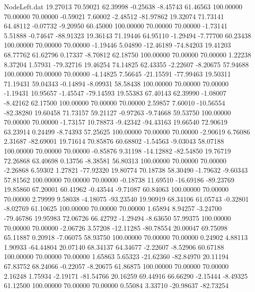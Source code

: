 \begin{filecontents}{NodeLeft.dat}
  19.27013   70.59021   62.39998    -0.25638   -8.45743   61.46563  100.00000   70.00000   70.00000   -0.59021    7.60002   -2.48512  -81.97862
  19.32074   71.73141   64.48112    -0.07732   -9.20950   60.45000  100.00000   70.00000   70.00000   -1.73141    5.51888   -0.74647  -88.91323
  19.36143   71.19446   64.95110    -1.29494   -7.77700   60.23438  100.00000   70.00000   70.00000   -1.19446    5.04890  -12.46189  -74.84203
  19.41203   68.77762   61.62796     0.17337   -8.70812   62.18750  100.00000   70.00000   70.00000    1.22238    8.37204    1.57931  -79.32716
  19.46254   74.14825   62.43355    -2.22607   -8.20675   57.94688  100.00000   70.00000   70.00000   -4.14825    7.56645  -21.15591  -77.99463
  19.50311   71.19431   59.04343    -0.14894   -8.09931   58.58438  100.00000   70.00000   70.00000   -1.19431   10.95657   -1.45547  -79.14593
  19.55383   67.40143   62.39990    -1.08007   -8.42162   62.17500  100.00000   70.00000   70.00000    2.59857    7.60010  -10.56554  -82.38280
  19.60458   71.73157   59.21127    -0.97263   -9.74668   59.53750  100.00000   70.00000   70.00000   -1.73157   10.78873   -9.42342  -94.43163
  19.66540   72.90619   63.23914     0.24499   -8.74393   57.25625  100.00000   70.00000   70.00000   -2.90619    6.76086    2.31687  -82.69001
  19.71614   70.85876   60.68802    -1.54563   -9.03043   58.07188  100.00000   70.00000   70.00000   -0.85876    9.31198  -14.12882  -82.54850
  19.76719   72.26868   63.40698     0.13756   -8.38581   56.80313  100.00000   70.00000   70.00000   -2.26868    6.59302    1.27821  -77.92320
  19.80774   70.18738   58.30490    -1.79632   -9.60343   57.81562  100.00000   70.00000   70.00000   -0.18738   11.69510  -16.69186  -89.23769
  19.85860   67.20001   60.41962    -0.43544   -9.71087   60.84063  100.00000   70.00000   70.00000    2.79999    9.58038   -4.18075  -93.23540
  19.90919   68.34106   61.05743    -0.32801   -8.02769   61.10625  100.00000   70.00000   70.00000    1.65894    8.94257   -3.24700  -79.46786
  19.95983   72.06726   66.42792    -1.29494   -8.63650   57.99375  100.00000   70.00000   70.00000   -2.06726    3.57208  -12.11285  -80.78554
  20.00047   69.75098   65.11887     0.20918   -7.06075   58.93750  100.00000   70.00000   70.00000    0.24902    4.88113    1.90933  -64.44804
  20.07140   68.34137   64.34677    -2.22607   -8.52906   60.67188  100.00000   70.00000   70.00000    1.65863    5.65323  -21.62360  -82.84970
  20.11194   67.83752   68.24066    -0.22057   -8.20675   61.86875  100.00000   70.00000   70.00000    2.16248    1.75934   -2.19171  -81.54766
  20.16259   69.44916   66.66290    -2.15444   -8.49325   61.12500  100.00000   70.00000   70.00000    0.55084    3.33710  -20.98637  -82.73254

\end{filecontents}
